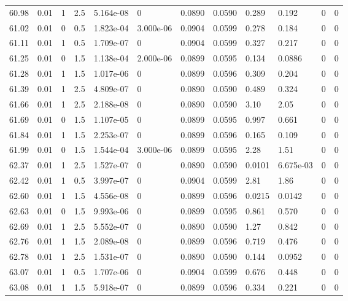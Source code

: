 \documentclass[preview]{standalone}
\begin{document}
{{{{{{{{{{{{\begin{tabular}{L{1.2cm}C{1.2cm} C{0.3cm}C{0.5cm} C{1.4cm}C{1.4cm} C{1.4cm}C{1.4cm} C{1.6cm}C{1.6cm} C{1.6cm}C{1.6cm}}
  60.98  &  0.01  & 1     & 2.5 &  5.164e-08  & 0  &  0.0890&   0.0590& 0.289 & 0.192   &  0 & 0  \\ 
  61.02  &  0.01  & 0     & 0.5 &  1.823e-04  & 3.000e-06  &  0.0904&   0.0599& 0.278 & 0.184   &  0 & 0  \\ 
  61.11  &  0.01  & 1     & 0.5 &  1.709e-07  & 0  &  0.0904&   0.0599& 0.327 & 0.217   &  0 & 0  \\ 
  61.25  &  0.01  & 0     & 1.5 &  1.138e-04  & 2.000e-06  &  0.0899&   0.0595& 0.134 & 0.0886   &  0 & 0  \\ 
  61.28  &  0.01  & 1     & 1.5 &  1.017e-06  & 0  &  0.0899&   0.0596& 0.309 & 0.204   &  0 & 0  \\ 
  61.39  &  0.01  & 1     & 2.5 &  4.809e-07  & 0  &  0.0890&   0.0590& 0.489 & 0.324   &  0 & 0  \\ 
  61.66  &  0.01  & 1     & 2.5 &  2.188e-08  & 0  &  0.0890&   0.0590& 3.10 & 2.05   &  0 & 0  \\ 
  61.69  &  0.01  & 0     & 1.5 &  1.107e-05  & 0  &  0.0899&   0.0595& 0.997 & 0.661   &  0 & 0  \\ 
  61.84  &  0.01  & 1     & 1.5 &  2.253e-07  & 0  &  0.0899&   0.0596& 0.165 & 0.109   &  0 & 0  \\ 
  61.99  &  0.01  & 0     & 1.5 &  1.544e-04  & 3.000e-06  &  0.0899&   0.0595& 2.28 & 1.51   &  0 & 0  \\ 
  62.37  &  0.01  & 1     & 2.5 &  1.527e-07  & 0  &  0.0890&   0.0590& 0.0101 & 6.675e-03   &  0 & 0  \\ 
  62.42  &  0.01  & 1     & 0.5 &  3.997e-07  & 0  &  0.0904&   0.0599& 2.81 & 1.86   &  0 & 0  \\ 
  62.60  &  0.01  & 1     & 1.5 &  4.556e-08  & 0  &  0.0899&   0.0596& 0.0215 & 0.0142   &  0 & 0  \\ 
  62.63  &  0.01  & 0     & 1.5 &  9.993e-06  & 0  &  0.0899&   0.0595& 0.861 & 0.570   &  0 & 0  \\ 
  62.69  &  0.01  & 1     & 2.5 &  5.552e-07  & 0  &  0.0890&   0.0590& 1.27 & 0.842   &  0 & 0  \\ 
  62.76  &  0.01  & 1     & 1.5 &  2.089e-08  & 0  &  0.0899&   0.0596& 0.719 & 0.476   &  0 & 0  \\ 
  62.78  &  0.01  & 1     & 2.5 &  1.531e-07  & 0  &  0.0890&   0.0590& 0.144 & 0.0952   &  0 & 0  \\ 
  63.07  &  0.01  & 1     & 0.5 &  1.707e-06  & 0  &  0.0904&   0.0599& 0.676 & 0.448   &  0 & 0  \\ 
  63.08  &  0.01  & 1     & 1.5 &  5.918e-07  & 0  &  0.0899&   0.0596& 0.334 & 0.221   &  0 & 0  \\ 

\end{tabular}}}}}}}}}}}}}
\end{document}
